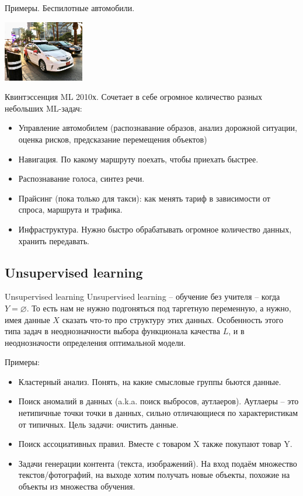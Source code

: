 \documentclass[9pt]{beamer}
\begin{document}
\begin{frame}{Примеры. Беспилотные автомобили.}
\begin{center}\includegraphics[height=100px]{img/intro_self_driving_cars.jpg}\end{center}
Квинтэссенция ML 2010х. Сочетает в себе огромное количество разных небольших ML-задач:
\begin{itemize}
    \item Управление автомобилем (распознавание образов, анализ дорожной ситуации, оценка рисков, предсказание перемещения объектов)
    \item Навигация. По какому маршруту поехать, чтобы приехать быстрее.
    \item Распознавание голоса, синтез речи.
    \item Прайсинг (пока только для такси): как менять тариф в зависимости от спроса, маршрута и трафика.
    \item Инфраструктура. Нужно быстро обрабатывать огромное количество данных, хранить передавать.
\end{itemize}
\end{frame}


\subsection{Unsupervised learning}
\begin{frame}{Unsupervised learning}
Unsupervised learning -- обучение без учителя -- когда $Y=\varnothing$. То есть нам не нужно подгоняться под таргетную переменную, а нужно, имея данные $X$ сказать что-то про структуру этих данных. Особенность этого типа задач в неоднозначности выбора функционала качества $L$, и в неоднозначости определения оптимальной модели.

Примеры:
\begin{itemize}
    \item Кластерный анализ. Понять, на какие смысловые группы бьются данные.
    \item Поиск аномалий в данных (a.k.a. поиск выбросов, аутлаеров). Аутлаеры -- это нетипичные точки точки в данных, сильно отличающиеся по характеристикам от типичных. Цель задачи: очистить данные.
    \item Поиск ассоциативных правил. Вместе с товаром X также покупают товар Y.
    \item Задачи генерации контента (текста, изображений). На вход подаём множество текстов/фотографий, на выходе хотим получать новые объекты, похожие на объекты из множества обучения.
\end{itemize}
\end{frame}
\end{document}
